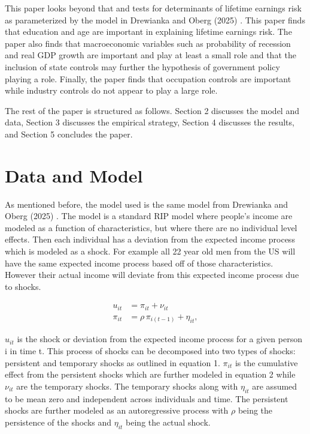 \documentclass[12pt]{article}
\begin{document}
\begin{onehalfspace}
This paper looks beyond that and tests for determinants of lifetime earnings risk as parameterized by the model in Drewianka and Oberg (2025) \cite{drewianka2025}. This paper finds that education and age are important in explaining lifetime earnings risk. The paper also finds that macroeconomic variables such as probability of recession and real GDP growth are important and play at least a small role and that the inclusion of state controls may further the hypothesis of government policy playing a role. Finally, the paper finds that occupation controls are important while industry controls do not appear to play a large role.

The rest of the paper is structured as follows. Section 2 discusses the model and data, Section 3 discusses the empirical strategy, Section 4 discusses the results, and Section 5 concludes the paper. 

\section{Data and Model}

As mentioned before, the model used is the same model from Drewianka and Oberg (2025) \cite{drewianka2025}. The model is a standard RIP model where people's income are modeled as a function of characteristics, but where there are no individual level effects. Then each individual has a deviation from the expected income process which is modeled as a shock. For example all 22 year old men from the US will have the same expected income process based off of those characteristics. However their actual income will deviate from this expected income process due to shocks. 

\begin{align}
u_{it} 
&= \pi_{it} + \nu_{it} \\[1ex]
\pi_{it} 
&= \rho\,\pi_{i(t-1)} + \eta_{it},
\end{align}

$u_{it}$ is the shock or deviation from the expected income process for a given person i in time t. This process of shocks can be decomposed into two types of shocks: persistent and temporary shocks as outlined in equation 1. $\pi_{it}$ is the cumulative effect from the persistent shocks which are further modeled in equation 2 while $\nu_{it}$ are the temporary shocks. The temporary shocks along with $\eta_{it}$ are assumed to be mean zero and independent across individuals and time. The persistent shocks are further modeled as an autoregressive process with $\rho$ being the persistence of the shocks and $\eta_{it}$ being the actual shock.


\end{onehalfspace}
\end{document}
